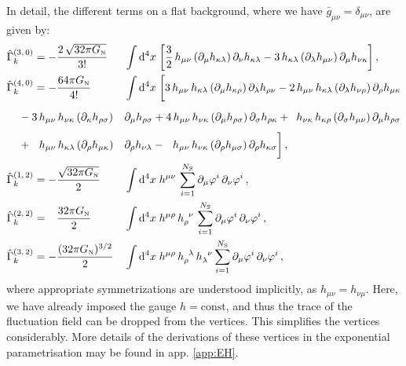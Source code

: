 \documentclass[11pt]{book} %
\newcommand\NS{ N_{\scriptscriptstyle{\mathrm{S}}} }
\newcommand\GNewton{ G_{\scriptscriptstyle{\mathrm{N}}} }
\numberwithin{equation}{chapter}
\begin{document}
In detail, the different terms on a flat background, where we have $\bar{g}_{\mu \nu} = \delta_{\mu \nu}$, are given by:
\begin{alignat}{2}
  &\hat \Gamma^{(3,\, 0)}_k = -\frac{ 2 \, \sqrt{32\pi \GNewton} }{ 3! } &&\int \mathrm d^4x \;
  \bigg[
    \frac{3}{2} \, h_{\mu\nu} \left(\partial_{\mu}h_{\kappa\lambda} \right)\partial_{\nu}h_{\kappa\lambda}
    - 3 \, h_{\kappa \lambda} \left(\partial_{\lambda}h_{\mu\nu} \right)\partial_{\mu}h_{\nu\kappa}
  \bigg] \,, \label{GammaG3} \\
  &\hat \Gamma^{(4,\, 0)}_k = - \frac{ 64\pi \GNewton }{ 4! }  &&\int \mathrm d^4x \;
  \bigg[
    3 \, h_{\mu\nu} \, h_{\kappa\lambda}  \left( \partial_{\mu} h_{\kappa\rho} \right) \partial_{\lambda}h_{\rho\nu}
    - 2 \, h_{\mu\nu} \, h_{\kappa \lambda} \left( \partial_{\lambda} h_{\nu\rho} \right) \partial_{\rho} h_{\mu\kappa} \nonumber \\
    & \hspace{3.8mm} \vphantom{ \frac{ 64\pi \GNewton }{ 4! } } - 3 \, h_{\mu\nu} \, h_{\nu\kappa} \left( \partial_{\kappa} h_{\rho\sigma} \right) && \partial_{\mu}h_{\rho\sigma}
    + 4 \, h_{\mu\nu} \, h_{\nu\kappa} \left( \partial_{\mu} h_{\rho\sigma} \right) \partial_{\sigma} h_{\rho\kappa}
    + \hphantom{3} h_{\nu\kappa} \, h_{\kappa\rho} \left( \partial_{\sigma} h_{\mu\nu} \right) \partial_{\mu} h_{\rho\sigma} \nonumber \\
    & \hspace{3.8mm} \vphantom{ \frac{ 64\pi \GNewton }{ 4! } } + \hphantom{3\,} h_{\mu\nu} \, h_{\kappa\lambda} \left( \partial_{\rho} h_{\mu\kappa} \right) && \partial_{\rho} h_{\nu\lambda}
    - \hphantom{4\, } h_{\mu\nu} \, h_{\nu\kappa} \left(\partial_{\rho} h_{\mu\sigma}\right) \partial_{\rho} h_{\kappa\sigma}
  \bigg] \,, \label{GammaG4}\\
  &\hat \Gamma^{(1,\, 2)}_k = - \frac{\sqrt{32 \pi  \GNewton}}{2}        &&\int \mathrm d^4x \; h^{\mu \nu}  \,
    \sum_{i=1}^{\NS} \partial_{\mu}\varphi^i \, \partial_{\nu}\varphi^i \,, \label{Gammag3} \\
  &\hat \Gamma^{(2,\, 2)}_k = \hphantom{-} \frac{32 \pi  \GNewton}{2}    &&\int \mathrm d^4x \; h^{\mu \rho} \, h_{\rho}^{\phantom{\rho}\nu} \,
    \sum_{i=1}^{\NS} \partial_{\mu}\varphi^i \, \partial_{\nu}\varphi^i \,, \label{Gammag4} \\
  &\hat \Gamma^{(3,\, 2)}_k = - \frac{     (32 \pi  \GNewton)^{3/2}}{2}  &&\int \mathrm d^4x \; h^{\mu \rho} \, h_{\rho}^{\phantom{\rho}\lambda} \, h_{\lambda}^{\phantom{\lambda}\nu}
    \sum_{i=1}^{\NS} \partial_{\mu}\varphi^i \, \partial_{\nu}\varphi^i \,, \label{Gammag5}
\end{alignat}
where appropriate symmetrizations are understood implicitly, as $h_{\mu \nu} = h_{\nu \mu}$.
Here, we have already imposed the gauge $h = \mathrm{const}$,
and thus the trace of the fluctuation field can be dropped from the vertices.
This simplifies the vertices considerably. More details of the derivations of these vertices
in the exponential parametrisation may be found in app. \ref{app:EH}.
\end{document}
